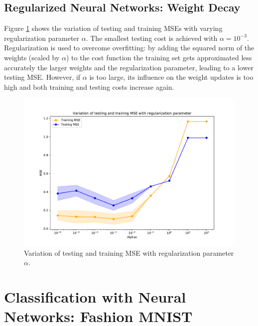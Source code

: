 \documentclass{article}
\begin{document}
\clearpage
\subsection{Regularized Neural Networks: Weight Decay}

Figure \ref{1_2_mse} shows the variation of testing and training MSEs with varying regularization parameter $\alpha$. The smallest testing cost is achieved with $\alpha=10^{-3}$.\\
Regularization is used to overcome overfitting: by adding the squared norm of the weights (scaled by $\alpha$) to the cost function the training set gets approximated less accurately the larger weights and the regularization parameter, leading to a lower testing MSE. However, if $\alpha$ is too large, its influence on the weight updates is too high and both training and testing costs increase again.

\begin{figure}[!ht]
\centering
\includegraphics[width=\textwidth]{./Figures/1_2_mse.pdf}
\caption{Variation of testing and training MSE with regularization parameter $\alpha$.}
\label{1_2_mse}
\end{figure}

\clearpage
\section{Classification with Neural Networks: Fashion MNIST}
\end{document}
